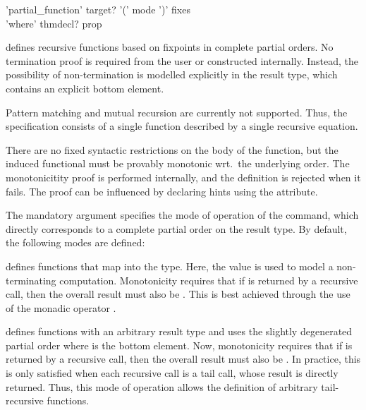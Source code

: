 \begin{isabellebody}
\begin{isamarkuptext}
  \begin{rail}
    'partial_function' target? '(' mode ')' fixes \\ 'where' thmdecl? prop
  \end{rail}

  \begin{description}

  \item \hyperlink{command.HOL.partial-function}{\mbox{}} defines recursive
  functions based on fixpoints in complete partial orders. No
  termination proof is required from the user or constructed
  internally. Instead, the possibility of non-termination is modelled
  explicitly in the result type, which contains an explicit bottom
  element.

  Pattern matching and mutual recursion are currently not supported.
  Thus, the specification consists of a single function described by a
  single recursive equation.

  There are no fixed syntactic restrictions on the body of the
  function, but the induced functional must be provably monotonic
  wrt.\ the underlying order.  The monotonicitity proof is performed
  internally, and the definition is rejected when it fails. The proof
  can be influenced by declaring hints using the
  \hyperlink{attribute.HOL.partial-function-mono}{\mbox{}} attribute.

  The mandatory  argument specifies the mode of operation
  of the command, which directly corresponds to a complete partial
  order on the result type. By default, the following modes are
  defined:

  \begin{description}
  \item {} defines functions that map into the  type. Here, the value  is used to model a
  non-terminating computation. Monotonicity requires that if  is returned by a recursive call, then the overall result
  must also be . This is best achieved through the use of
  the monadic operator .

  \item {} defines functions with an arbitrary result
  type and uses the slightly degenerated partial order where  is the bottom element.  Now, monotonicity requires that
  if  is returned by a recursive call, then the
  overall result must also be . In practice, this is
  only satisfied when each recursive call is a tail call, whose result
  is directly returned. Thus, this mode of operation allows the
  definition of arbitrary tail-recursive functions.
  \end{description}


\end{description}
\end{isamarkuptext}
\end{isabellebody}
